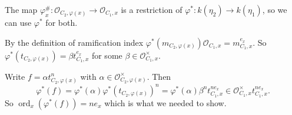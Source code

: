 \begin{exercise}{1}
\begin{enumerate}[label=(\roman*)]
{                The map $\varphi^\#_x \colon \mathcal{O}_{C_2, \varphi(x)} \to
                \mathcal{O}_{C_1, x}$ is a restriction of $\varphi^* \colon
                k(\eta_2) \to k(\eta_1)$, so we can use $\varphi^*$ for both.

                By the definition of ramification index $\varphi^*(m_{C_2,
                \varphi(x)}) \mathcal{O}_{C_1, x} = m_{C_1, x}^{e_x}$.
                So $\varphi^*(t_{C_2, \varphi(x)}) = \beta t_{C_1, x}^{e_x}$ for
                some $\beta \in \mathcal{O}^\times_{C_1, x}$.

                Write $f = \alpha t^n_{C_2, \varphi(x)}$ with $\alpha \in
                \mathcal{O}_{C_2, \varphi(x)}^\times$.
                Then
                \begin{equation*}
                    \varphi^*(f) = \varphi^*(\alpha) \varphi^*(t_{C_2,
                    \varphi(x)})^n = \varphi^*(\alpha) \beta^n t^{n
                    e_x}_{C_1, x} \in \mathcal{O}_{C_1, x}^\times t^{n
                    e_x}_{C_1, x}.
                \end{equation*}
                So $\operatorname{ord}_x(\varphi^*(f)) = n e_x$ which is what
                we needed to show.
            }
    \end{enumerate}
\end{exercise}




